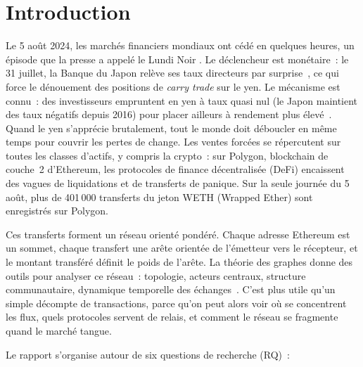 
\section{Introduction}
\label{sec:introduction}

Le 5 ao\^ut 2024, les march\'es financiers mondiaux ont c\'ed\'e en quelques
heures, un \'episode que la presse a appel\'e le \og Lundi Noir \fg{}. Le
d\'eclencheur est mon\'etaire~: le 31 juillet, la Banque du Japon rel\`eve ses
taux directeurs par surprise~\cite{boj2024rate}, ce qui force le d\'enouement
des positions de \textit{carry trade} sur le yen. Le m\'ecanisme est connu~:
des investisseurs empruntent en yen \`a taux quasi nul (le Japon maintient des
taux n\'egatifs depuis 2016) pour placer ailleurs \`a rendement plus
\'elev\'e~\cite{reuters2024carrytrade}. Quand le yen s'appr\'ecie brutalement,
tout le monde doit d\'eboucler en m\^eme temps pour couvrir les pertes de
change. Les ventes forc\'ees se r\'epercutent sur toutes les classes d'actifs,
y compris la crypto~: sur Polygon, blockchain de couche~2 d'Ethereum, les
protocoles de finance d\'ecentralis\'ee (DeFi) encaissent des vagues de
liquidations et de transferts de panique. Sur la seule journ\'ee du 5 ao\^ut,
plus de 401\,000 transferts du jeton WETH (Wrapped Ether) sont
enregistr\'es sur Polygon.

Ces transferts forment un r\'eseau orient\'e pond\'er\'e. Chaque adresse
Ethereum est un sommet, chaque transfert une ar\^ete orient\'ee de l'\'emetteur
vers le r\'ecepteur, et le montant transf\'er\'e d\'efinit le poids de l'ar\^ete.
La th\'eorie des graphes donne des outils pour analyser ce r\'eseau~:
topologie, acteurs centraux, structure communautaire, dynamique temporelle
des \'echanges~\cite{newman2018networks}. C'est plus utile qu'un simple
d\'ecompte de transactions, parce qu'on peut alors voir o\`u se concentrent
les flux, quels protocoles servent de relais, et comment le r\'eseau se
fragmente quand le march\'e tangue.

Le rapport s'organise autour de six questions de recherche (RQ)~:

